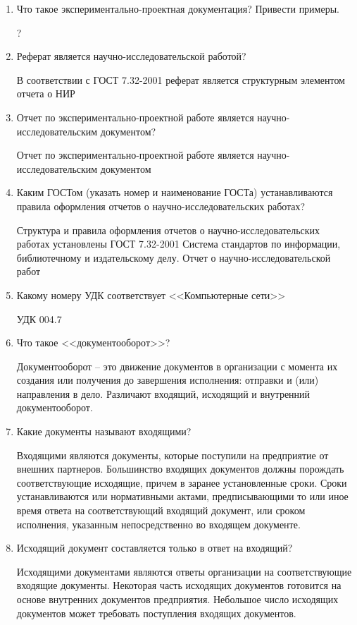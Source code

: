 \documentclass[a4paper,10pt]{article}
\theoremstyle{plain} %
\theoremstyle{definition} %
\theoremstyle{remark} %
\begin{document}
\begin{enumerate}
	\item Что такое экспериментально-проектная документация? Привести примеры.
	
	?

	\item Реферат является научно-исследовательской работой?
	
	В соответствии с ГОСТ 7.32-2001 реферат является структурным элементом отчета о НИР

	\item Отчет по экспериментально-проектной работе является научно-
исследовательским документом?

Отчет по экспериментально-проектной работе является научно-исследовательским документом

	\item Каким ГОСТом (указать номер и наименование ГОСТа) устанавливаются правила оформления отчетов о научно-исследовательских работах?
	
	Структура и правила оформления отчетов о научно-исследовательских работах установлены ГОСТ 7.32-2001 Система стандартов по информации, библиотечному и издательскому делу. Отчет о научно-исследовательской работ

	\item Какому номеру УДК соответствует <<Компьютерные сети>>
	
	УДК 004.7

	\item Что такое <<документооборот>>?
	
	Документооборот – это движение документов в организации с момента их создания или получения до завершения исполнения: отправки и (или) направления в дело. Различают входящий, исходящий и внутренний документооборот.

	\item Какие документы называют входящими?
	
	Входящими являются документы, которые поступили на предприятие от внешних партнеров. Большинство входящих документов должны порождать соответствующие исходящие, причем в заранее установленные сроки. Сроки устанавливаются или нормативными актами, предписывающими то или иное время ответа на соответствующий входящий документ, или сроком исполнения, указанным непосредственно во входящем документе.

	\item Исходящий документ составляется только в ответ на входящий?
	
	Исходящими документами являются ответы организации на соответствующие входящие документы. Некоторая часть исходящих документов готовится на основе внутренних документов предприятия. Небольшое число исходящих документов может требовать поступления входящих документов.


\end{enumerate}
\end{document}
